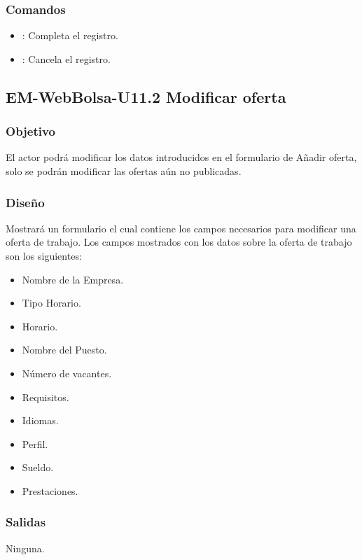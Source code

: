 \subsubsection{Comandos}
\begin{itemize}
	\item {}: Completa el registro.  
	\item {}: Cancela el registro.  
\end{itemize}



\subsection{EM-WebBolsa-U11.2 Modificar oferta}

\subsubsection{Objetivo}
	\noindent
	El actor podrá modificar los datos introducidos en el formulario de Añadir oferta, solo se podrán modificar las ofertas aún no publicadas. 

\subsubsection{Diseño}
	\noindent
	Mostrará un formulario el cual contiene los campos necesarios para modificar una oferta de trabajo. 
	Los campos mostrados con los datos sobre la oferta de trabajo son los siguientes: 
	\begin{itemize}
		\item Nombre de la Empresa.
		\item Tipo Horario.
		\item Horario.
		\item Nombre del Puesto.
		\item Número de vacantes.
		\item Requisitos.
		\item Idiomas.
		\item Perfil.
		\item Sueldo.
		\item Prestaciones. 
	\end{itemize}


\subsubsection{Salidas}
	\noindent
	Ninguna.
	
